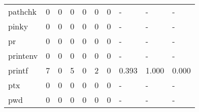 \begin{longtable}{lp{1.3cm}p{1.3cm}p{1.3cm}p{1.3cm}p{1.3cm}p{1.3cm}p{1.3cm}p{1.3cm}p{1.3cm}}
pathchk   &                      0 &                                             0 &                                            0 &                                           0 &                                            0 &                                          0 &                                    - &                                      - &                                    - \\
pinky     &                      0 &                                             0 &                                            0 &                                           0 &                                            0 &                                          0 &                                    - &                                      - &                                    - \\
pr        &                      0 &                                             0 &                                            0 &                                           0 &                                            0 &                                          0 &                                    - &                                      - &                                    - \\
printenv  &                      0 &                                             0 &                                            0 &                                           0 &                                            0 &                                          0 &                                    - &                                      - &                                    - \\
printf    &                      7 &                                             0 &                                            5 &                                           0 &                                            2 &                                          0 &                                0.393 &                                  1.000 &                                0.000 \\
ptx       &                      0 &                                             0 &                                            0 &                                           0 &                                            0 &                                          0 &                                    - &                                      - &                                    - \\
pwd       &                      0 &                                             0 &                                            0 &                                           0 &                                            0 &                                          0 &                                    - &                                      - &                                    - \\

\end{longtable}
